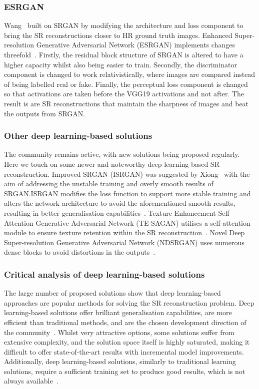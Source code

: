 \subsubsection{ESRGAN}
Wang \etal\ built on SRGAN by modifying the architecture and loss component to bring the SR reconstructions closer to HR ground truth images. Enhanced Super-resolution Generative Adversarial Network (ESRGAN) implements changes threefold~\cite{esrgan}. Firstly, the residual block structure of SRGAN is altered to have a higher capacity whilst also being easier to train. Secondly, the discriminator component is changed to work relativistically, where images are compared instead of being labelled real or fake. Finally, the perceptual loss component is changed so that activations are taken before the VGG19 activations and not after. The result is are SR reconstructions that maintain the sharpness of images and beat the outputs from SRGAN.\@

\subsubsection{Other deep learning-based solutions}
The community remains active, with new solutions being proposed regularly. Here we touch on some newer and noteworthy deep learning-based SR reconstruction. Improved SRGAN (ISRGAN) was suggested by Xiong \etal\ with the aim of addressing the unstable training and overly smooth results of SRGAN.\@ ISRGAN modifies the loss function to support more stable training and alters the network architecture to  avoid the aforementioned smooth results, resulting in better generalisation capabilities~\cite{isrgan,remoteSensingGANsReview}. Texture Enhancement Self Attention Generative Adversarial Network (TE-SAGAN) utilises a self-attention module to ensure texture retention within the SR reconstruction~\cite{tesagan, remoteSensingGANsReview}. Novel Deep Super-resolution Generative Adversarial Network (NDSRGAN) uses numerous dense blocks to avoid distortions in the outputs~\cite{ndsrgan, remoteSensingGANsReview}. 

\subsubsection{Critical analysis of deep learning-based solutions}
The large number of proposed solutions show that deep learning-based approaches are popular methods for solving the SR reconstruction problem. Deep learning-based solutions offer brilliant generalisation capabilities, are more efficient than traditional methods, and are the chosen development direction of the community~\cite{ndsrgan}. Whilst very attractive options, some solutions suffer from extensive complexity, and the solution space itself is highly saturated, making it difficult to offer state-of-the-art results with incremental model improvements. Additionally, deep learning-based solutions, similarly to traditional learning solutions, require a sufficient training set to produce good results, which is not always available~\cite{superResRemoteSensingOverview}.

